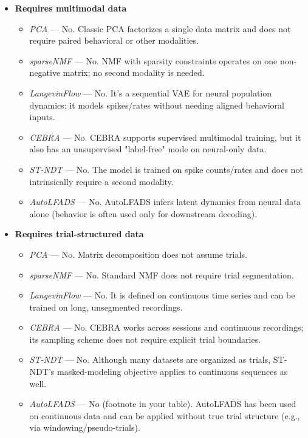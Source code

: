 \begin{itemize}
\item \textbf{Requires multimodal data}
    \begin{itemize}
    \item \textit{PCA} — No. Classic PCA factorizes a single data matrix and does not require paired behavioral or other modalities.
    \item \textit{sparseNMF} — No. NMF with sparsity constraints operates on one non-negative matrix; no second modality is needed.
    \item \textit{LangevinFlow} — No. It's a sequential VAE for neural population dynamics; it models spikes/rates without needing aligned behavioral inputs.
    \item \textit{CEBRA} — No. CEBRA supports supervised multimodal training, but it also has an unsupervised "label-free" mode on neural-only data.
    \item \textit{ST-NDT} — No. The model is trained on spike counts/rates and does not intrinsically require a second modality.
    \item \textit{AutoLFADS} — No. AutoLFADS infers latent dynamics from neural data alone (behavior is often used only for downstream decoding).
    \end{itemize}

\item \textbf{Requires trial-structured data}
    \begin{itemize}
    \item \textit{PCA} — No. Matrix decomposition does not assume trials.
    \item \textit{sparseNMF} — No. Standard NMF does not require trial segmentation.
    \item \textit{LangevinFlow} — No. It is defined on continuous time series and can be trained on long, unsegmented recordings.
    \item \textit{CEBRA} — No. CEBRA works across sessions and continuous recordings; its sampling scheme does not require explicit trial boundaries.
    \item \textit{ST-NDT} — No. Although many datasets are organized as trials, ST-NDT's masked-modeling objective applies to continuous sequences as well.
    \item \textit{AutoLFADS} — No (footnote in your table). AutoLFADS has been used on continuous data and can be applied without true trial structure (e.g., via windowing/pseudo-trials).
    \end{itemize}


\end{itemize}
